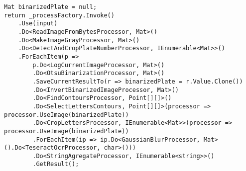 \begin{lstlisting}[style=csharpstyle, caption={Пример автоматического вывода типа функции}, label=lst:creation:pipes_example]
Mat binarizedPlate = null;
return _processFactory.Invoke()
	.Use(input)
    .Do<ReadImageFromBytesProcessor, Mat>()
    .Do<MakeImageGrayProcessor, Mat>()
    .Do<DetectAndCropPlateNumberProcessor, IEnumerable<Mat>>()
    .ForEachItem(p => 
        p.Do<LogCurrentImageProcessor, Mat>()
        .Do<OtsuBinarizationProcessor, Mat>()
        .SaveCurrentResultTo(r => binarizedPlate = r.Value.Clone())
        .Do<InvertBinarizedImageProcessor, Mat>()
        .Do<FindContoursProcessor, Point[][]>()
        .Do<SelectLettersContours, Point[][]>(processor => processor.UseImage(binarizedPlate))
        .Do<CropLettersProcessor, IEnumerable<Mat>>(processor => processor.UseImage(binarizedPlate))
        .ForEachItem(ip => ip.Do<GaussianBlurProcessor, Mat>().Do<TeseractOcrProcessor, char>()))
        .Do<StringAgregateProcessor, IEnumerable<string>>()
        .GetResult();
\end{lstlisting}